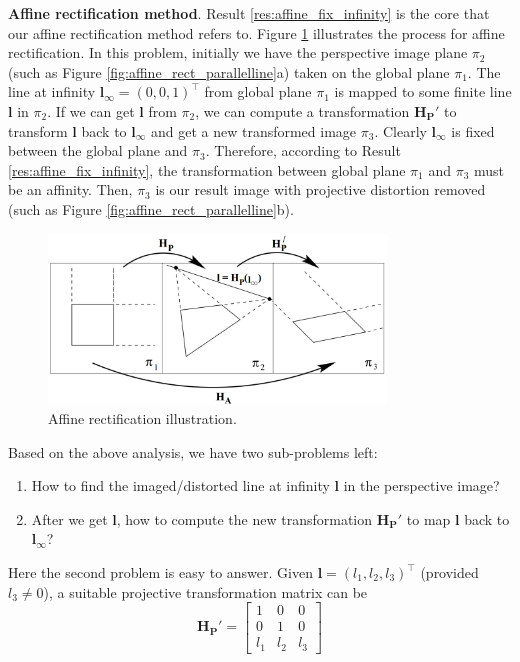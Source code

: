\documentclass[12pt]{article}
\numberwithin{equation}{section}
\begin{document}
\textbf{Affine rectification method}. Result \ref{res:affine_fix_infinity} is the core that our affine rectification method refers to. Figure \ref{fig:affine_rect} illustrates the process for affine rectification. In this problem, initially we have the perspective image plane $\pi_2$ (such as Figure \ref{fig:affine_rect_parallelline}a) taken on the global plane $\pi_1$. The line at infinity $\mathbf{l}_{\infty} = (0, 0, 1)^\top$ from global plane $\pi_1$ is mapped to some finite line $\mathbf{l}$ in $\pi_2$. If we can get $\mathbf{l}$ from $\pi_2$, we can compute a transformation $\mathbf{H_P}'$ to transform $\mathbf{l}$ back to $\mathbf{l}_{\infty}$ and get a new transformed image $\pi_3$. Clearly $\mathbf{l}_{\infty}$ is fixed between the global plane and $\pi_3$. Therefore, according to Result \ref{res:affine_fix_infinity}, the transformation between global plane $\pi_1$ and $\pi_3$ must be an affinity. Then, $\pi_3$ is our result image with projective distortion removed (such as Figure \ref{fig:affine_rect_parallelline}b).

\begin{figure}[h]
\begin{center}
\includegraphics[width=0.8\textwidth]{affine_rect01.png}
\end{center}
\caption{Affine rectification illustration.}
\label{fig:affine_rect}
\end{figure}

Based on the above analysis, we have two sub-problems left: 
\begin{enumerate}
\item How to find the imaged/distorted line at infinity $\mathbf{l}$ in the perspective image? 
\item After we get $\mathbf{l}$, how to compute the new transformation $\mathbf{H_P}'$ to map $\mathbf{l}$ back to $\mathbf{l}_{\infty}$?
\end{enumerate}
Here the second problem is easy to answer. Given $\mathbf{l} = (l_1, l_2, l_3)^\top$ (provided $l_3 \neq 0$), a suitable projective transformation matrix can be
\begin{equation*}
\mathbf{H_P}' = 
\begin{bmatrix}
1 & 0 & 0\\
0 & 1 & 0\\
l_1 & l_2 & l_3
\end{bmatrix}
\end{equation*}
\end{document}
